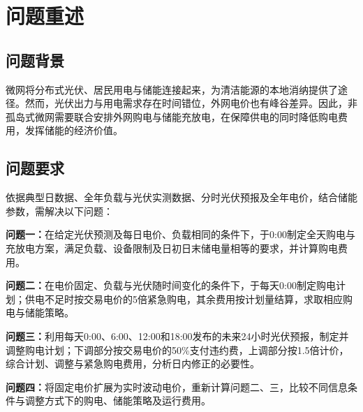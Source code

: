 \section{问题重述}
\label{sec:frontmatter-restatement}

\subsection{问题背景}

微网将分布式光伏、居民用电与储能连接起来，为清洁能源的本地消纳提供了途径。然而，光伏出力与用电需求存在时间错位，外网电价也有峰谷差异。因此，非孤岛式微网需要联合安排外网购电与储能充放电，在保障供电的同时降低购电费用，发挥储能的经济价值。

\subsection{问题要求}

依据典型日数据、全年负载与光伏实测数据、分时光伏预报及全年电价，结合储能参数，需解决以下问题：

\textbf{问题一：}在给定光伏预测及每日电价、负载相同的条件下，于0:00制定全天购电与充放电方案，满足负载、设备限制及日初日末储电量相等的要求，并计算购电费用。

\textbf{问题二：}在电价固定、负载与光伏随时间变化的条件下，于每天0:00制定购电计划；供电不足时按交易电价的5倍紧急购电，其余费用按计划量结算，求取相应购电与储能策略。

\textbf{问题三：}利用每天0:00、6:00、12:00和18:00发布的未来24小时光伏预报，制定并调整购电计划；下调部分按交易电价的50\%支付违约费，上调部分按1.5倍计价，综合计划、调整与紧急购电费用，分析日内修正的必要性。

\textbf{问题四：}将固定电价扩展为实时波动电价，重新计算问题二、三，比较不同信息条件与调整方式下的购电、储能策略及运行费用。
